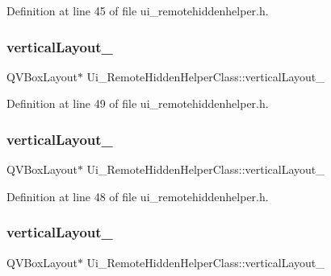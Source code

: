 Definition at line 45 of file ui\+\_\+remotehiddenhelper.\+h.

\hypertarget{class_ui___remote_hidden_helper_class_abccfcb5d74742fed5d64978da9ebc4b8}{}\label{class_ui___remote_hidden_helper_class_abccfcb5d74742fed5d64978da9ebc4b8} 
\subsubsection{\texorpdfstring{vertical\+Layout\+\_}{verticalLayout\_13}}
{\footnotesize\ttfamily Q\+V\+Box\+Layout$\ast$ Ui\+\_\+\+Remote\+Hidden\+Helper\+Class\+::vertical\+Layout\+\_}



Definition at line 49 of file ui\+\_\+remotehiddenhelper.\+h.

\hypertarget{class_ui___remote_hidden_helper_class_abd56027c9ccdaa206aacad1d7bce3eaf}{}\label{class_ui___remote_hidden_helper_class_abd56027c9ccdaa206aacad1d7bce3eaf} 
\subsubsection{\texorpdfstring{vertical\+Layout\+\_}{verticalLayout\_14}}
{\footnotesize\ttfamily Q\+V\+Box\+Layout$\ast$ Ui\+\_\+\+Remote\+Hidden\+Helper\+Class\+::vertical\+Layout\+\_}



Definition at line 48 of file ui\+\_\+remotehiddenhelper.\+h.

\hypertarget{class_ui___remote_hidden_helper_class_ad22dc7780120a5ada99015716388a2b8}{}\label{class_ui___remote_hidden_helper_class_ad22dc7780120a5ada99015716388a2b8} 
\subsubsection{\texorpdfstring{vertical\+Layout\+\_}{verticalLayout\_2}}
{\footnotesize\ttfamily Q\+V\+Box\+Layout$\ast$ Ui\+\_\+\+Remote\+Hidden\+Helper\+Class\+::vertical\+Layout\+\_}



